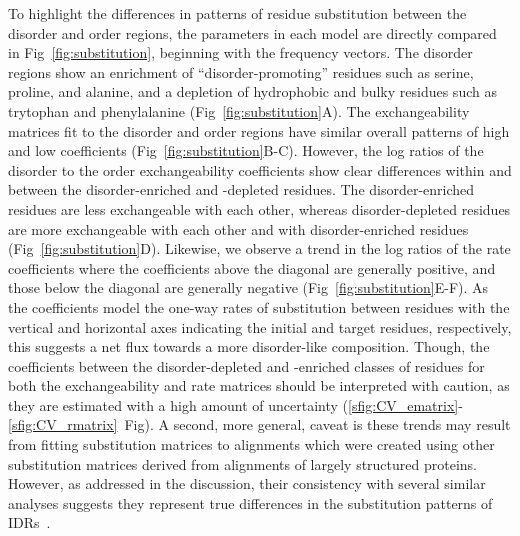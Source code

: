 To highlight the differences in patterns of residue substitution between the disorder and order regions, the parameters in each model are directly compared in Fig~\ref{fig:substitution}, beginning with the frequency vectors. The disorder regions show an enrichment of ``disorder-promoting'' residues such as serine, proline, and alanine, and a depletion of hydrophobic and bulky residues such as trytophan and phenylalanine (Fig~\ref{fig:substitution}A). The exchangeability matrices fit to the disorder and order regions have similar overall patterns of high and low coefficients (Fig~\ref{fig:substitution}B-C). However, the log ratios of the disorder to the order exchangeability coefficients show clear differences within and between the disorder-enriched and -depleted residues. The disorder-enriched residues are less exchangeable with each other, whereas disorder-depleted residues are more exchangeable with each other and with disorder-enriched residues (Fig~\ref{fig:substitution}D). Likewise, we observe a trend in the log ratios of the rate coefficients where the coefficients above the diagonal are generally positive, and those below the diagonal are generally negative (Fig~\ref{fig:substitution}E-F). As the coefficients model the one-way rates of substitution between residues with the vertical and horizontal axes indicating the initial and target residues, respectively, this suggests a net flux towards a more disorder-like composition. Though, the coefficients between the disorder-depleted and -enriched classes of residues for both the exchangeability and rate matrices should be interpreted with caution, as they are estimated with a high amount of uncertainty (\ref{sfig:CV_ematrix}-\ref{sfig:CV_rmatrix}~Fig). A second, more general, caveat is these trends may result from fitting substitution matrices to alignments which were created using other substitution matrices derived from alignments of largely structured proteins. However, as addressed in the discussion, their consistency with several similar analyses suggests they represent true differences in the substitution patterns of IDRs~\cite{Brown2009, Szalkowski2011}.


